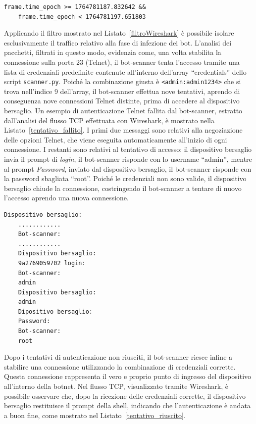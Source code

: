 \begin{lstlisting}[caption={Filtro Wireshark applicato per isolare la fase di infezione.}, label={filtroWireshark}]
    frame.time_epoch >= 1764781187.832642 &&
    frame.time_epoch < 1764781197.651803
\end{lstlisting}
Applicando il filtro mostrato nel Listato~\ref{filtroWireshark} è possibile isolare esclusivamente il traffico relativo alla fase di infezione dei bot. L'analisi dei pacchetti, filtrati in questo modo, evidenzia come, una volta stabilita la connessione sulla porta 23 (Telnet), il bot-scanner tenta l'accesso tramite una lista di credenziali predefinite contenute all'interno dell'array ``credentials'' dello script \texttt{scanner.py}. Poiché la combinazione giusta è \texttt{<admin:admin1234>} che si trova nell'indice 9 dell'array, il bot-scanner effettua nove tentativi, aprendo di conseguenza nove connessioni Telnet distinte, prima di accedere al dispositivo bersaglio. Un esempio di autenticazione Telnet fallita dal bot-scanner, estratto dall'analisi del flusso TCP effettuata con Wireshark, è mostrato nella Listato~\ref{tentativo_fallito}. I primi due messaggi sono relativi alla negoziazione delle opzioni Telnet, che viene eseguita automaticamente all'inizio di ogni connessione. I restanti sono relativi al tentativo di accesso: il dispositivo bersaglio invia il prompt di \emph{login}, il bot-scanner risponde con lo username ``admin'', mentre al prompt \emph{Password}, inviato dal dispositivo bersaglio, il bot-scanner risponde con la password sbagliata ``root''. Poiché le credenziali non sono valide, il dispositivo bersaglio chiude la connessione, costringendo il bot-scanner a tentare di nuovo l'accesso aprendo una nuova connessione.
\begin{lstlisting}[caption={Accesso fallito durante la fase di infezione.}, label={tentativo_fallito}]
    Dispositivo bersaglio:
    ............
    Bot-scanner:
    ............
    Dispositivo bersaglio:
    9a2769059702 login:
    Bot-scanner:
    admin
    Dispositivo bersaglio:
    admin
    Dipositivo bersaglio:
    Password:
    Bot-scanner:
    root
\end{lstlisting}
Dopo i tentativi di autenticazione non riusciti, il bot-scanner riesce infine a stabilire una connessione utilizzando la combinazione di credenziali corrette. Questa connessione rappresenta il vero e proprio punto di ingresso del dispositivo all'interno della botnet. Nel flusso TCP, visualizzato tramite Wireshark, è possibile osservare che, dopo la ricezione delle credenziali corrette, il dispositivo bersaglio restituisce il prompt della shell, indicando che l'autenticazione è andata a buon fine, come mostrato nel Listato~\ref{tentativo_riuscito}.

